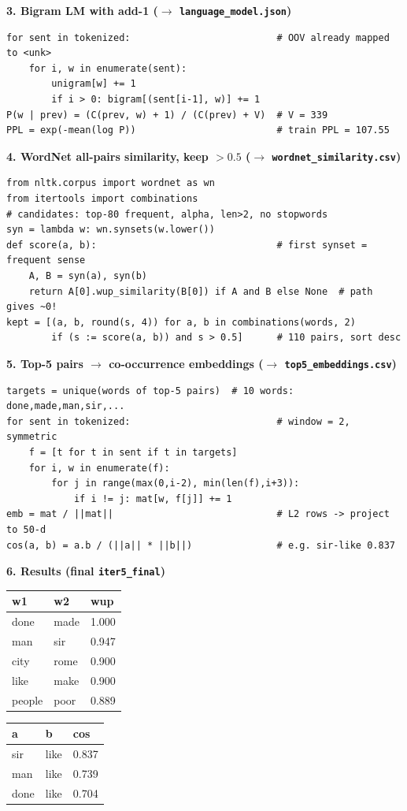 \documentclass[11pt,a4paper]{article}
\begin{document}
\textbf{3. Bigram LM with add-1 ($\to$ \texttt{language\_model.json})}
\begin{lstlisting}
for sent in tokenized:                          # OOV already mapped to <unk>
    for i, w in enumerate(sent):
        unigram[w] += 1
        if i > 0: bigram[(sent[i-1], w)] += 1
P(w | prev) = (C(prev, w) + 1) / (C(prev) + V)  # V = 339
PPL = exp(-mean(log P))                         # train PPL = 107.55
\end{lstlisting}

\textbf{4. WordNet all-pairs similarity, keep $>0.5$ ($\to$ \texttt{wordnet\_similarity.csv})}
\begin{lstlisting}
from nltk.corpus import wordnet as wn
from itertools import combinations
# candidates: top-80 frequent, alpha, len>2, no stopwords
syn = lambda w: wn.synsets(w.lower())
def score(a, b):                                # first synset = frequent sense
    A, B = syn(a), syn(b)
    return A[0].wup_similarity(B[0]) if A and B else None  # path gives ~0!
kept = [(a, b, round(s, 4)) for a, b in combinations(words, 2)
        if (s := score(a, b)) and s > 0.5]      # 110 pairs, sort desc
\end{lstlisting}

\textbf{5. Top-5 pairs $\to$ co-occurrence embeddings ($\to$ \texttt{top5\_embeddings.csv})}
\begin{lstlisting}
targets = unique(words of top-5 pairs)  # 10 words: done,made,man,sir,...
for sent in tokenized:                          # window = 2, symmetric
    f = [t for t in sent if t in targets]
    for i, w in enumerate(f):
        for j in range(max(0,i-2), min(len(f),i+3)):
            if i != j: mat[w, f[j]] += 1
emb = mat / ||mat||                             # L2 rows -> project to 50-d
cos(a, b) = a.b / (||a|| * ||b||)               # e.g. sir-like 0.837
\end{lstlisting}

\textbf{6. Results (final \texttt{iter5\_final})}
\begin{center}
\begin{tabular}{lll}\toprule w1 & w2 & wup \\\midrule
done & made & 1.000 \\ man & sir & 0.947 \\ city & rome & 0.900 \\
like & make & 0.900 \\ people & poor & 0.889 \\\bottomrule\end{tabular}
\qquad
\begin{tabular}{lll}\toprule a & b & cos \\\midrule
sir & like & 0.837 \\ man & like & 0.739 \\ done & like & 0.704 \\\bottomrule\end{tabular}
\end{center}
\end{document}
